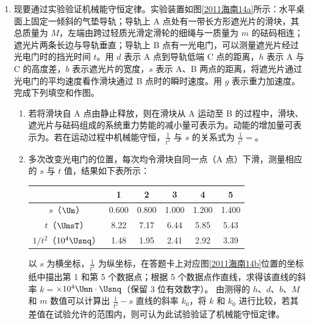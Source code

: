 \documentclass[\gkver]{gaokaozhenti}
\begin{document}
\begin{enumerate}
\item
现要通过实验验证机械能守恒定律。实验装置如图\ref{2011海南14a}所示：水平桌面上固定一倾斜的气垫导轨；导轨上 A 点处有一带长方形遮光片的滑块，其总质量为 $M$，左端由跨过轻质光滑定滑轮的细绳与一质量为 $m$ 的砝码相连；遮光片两条长边与导轨垂直；导轨上 B 点有一光电门，可以测量遮光片经过光电门时的挡光时间 $t$。用 $d$ 表示 A 点到导轨低端 C 点的距离，$h$ 表示 A 与 C 的高度差，$b$ 表示遮光片的宽度，$s$ 表示 A、B 两点的距离，将遮光片通过光电门的平均速度看作滑块通过 B 点时的瞬时速度。用 $g$ 表示重力加速度。完成下列填空和作图。
\begin{enumerate}
	\item
	若将滑块自 A 点由静止释放，则在滑块从 A 运动至 B 的过程中，滑块、遮光片与砝码组成的系统重力势能的减小量可表示为。动能的增加量可表示为。若在运动过程中机械能守恒，$\frac{1}{t^{2}}$ 与 $s$ 的关系式为 $\frac{1}{t^{2}}=$。
	\item
	多次改变光电门的位置，每次均令滑块自同一点（A 点）下滑，测量相应的 $s$ 与 $t$ 值，结果如下表所示：
	\begin{center}
	\begin{tabular}{|c|c|c|c|c|c|}
	\hline
	 & 1 & 2 & 3 & 4 & 5 \\ \hline
	$s$（$\Um$） & 0.600 & 0.800 & 1.000 & 1.200 & 1.400 \\ \hline
	$t$（$\UmsT$） & 8.22 & 7.17 & 6.44 & 5.85 & 5.43 \\ \hline
	$1/t^{2}$（$10^{4}\Usnq$） & 1.48 & 1.95 & 2.41 & 2.92 & 3.39 \\ \hline
	\end{tabular}
	\end{center}
	以 $s$ 为横坐标，$\frac{1}{t^{2}}$ 为纵坐标，在答题卡上对应图\ref{2011海南14b}位置的坐标纸中描出第 1 和第 5 个数据点；根据 5 个数据点作直线，求得该直线的斜率 $k=$$\times10^{4}\Umn\cdot\Usnq$（保留 3 位有效数字）。
	由测得的 $h$、$d$、$b$、$M$ 和 $m$ 数值可以计算出 $\frac{1}{t^{2}}-s$ 直线的斜率 $k_{0}$，将 $k$ 和 $k_{0}$ 进行比较，若其差值在试验允许的范围内，则可认为此试验验证了机械能守恒定律。
\end{enumerate}


\end{enumerate}
\end{document}
